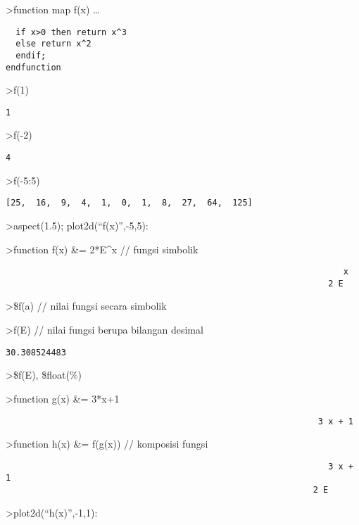 \documentclass[
]{book}
\begin{document}
\textgreater function map f(x) \ldots{}

\begin{verbatim}
  if x>0 then return x^3
  else return x^2
  endif;
endfunction
\end{verbatim}

\textgreater f(1)

\begin{verbatim}
1
\end{verbatim}

\textgreater f(-2)

\begin{verbatim}
4
\end{verbatim}

\textgreater f(-5:5)

\begin{verbatim}
[25,  16,  9,  4,  1,  0,  1,  8,  27,  64,  125]
\end{verbatim}

\textgreater aspect(1.5); plot2d(``f(x)'',-5,5):

\textgreater function f(x) \&= 2*E\^{}x // fungsi simbolik

\begin{verbatim}
                                                                   x
                                                                2 E
\end{verbatim}

\textgreater\$f(a) // nilai fungsi secara simbolik

\textgreater f(E) // nilai fungsi berupa bilangan desimal

\begin{verbatim}
30.308524483
\end{verbatim}

\textgreater\$f(E), \$float(\%)

\textgreater function g(x) \&= 3*x+1

\begin{verbatim}
                                                              3 x + 1
\end{verbatim}

\textgreater function h(x) \&= f(g(x)) // komposisi fungsi

\begin{verbatim}
                                                                3 x + 1
                                                             2 E
\end{verbatim}

\textgreater plot2d(``h(x)'',-1,1):
\end{document}
